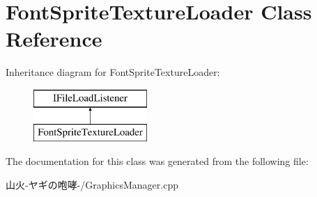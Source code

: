 \hypertarget{class_font_sprite_texture_loader}{}\section{Font\+Sprite\+Texture\+Loader Class Reference}
\label{class_font_sprite_texture_loader}
Inheritance diagram for Font\+Sprite\+Texture\+Loader\+:\begin{figure}[H]
\begin{center}
\leavevmode
\includegraphics[height=2.000000cm]{class_font_sprite_texture_loader}
\end{center}
\end{figure}


The documentation for this class was generated from the following file\+:\begin{DoxyCompactItemize}
\item 
山火-\/ヤギの咆哮-\//Graphics\+Manager.\+cpp\end{DoxyCompactItemize}

